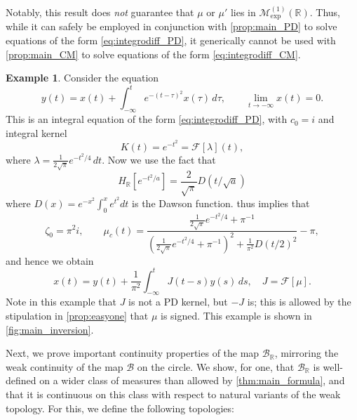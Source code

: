 \documentclass{cams-l} %
\newcommand{\dave}[1]{#1}\newcommand{\davebegin}{}\newcommand{\daveend}{}\newcommand{\george}[1]{#1}
\newcommand{\RR}{\mathbb R}
\newcommand{\cM}{\mathcal M}
\newcommand{\cB}{\mathcal B}
\newcommand{\cF}{\mathcal F}
\theoremstyle{definition}
\newtheorem{example}[theorem]{Example}
\theoremstyle{remark}
\numberwithin{equation}{section}
\begin{document}
Notably, this result does \emph{not} guarantee that $\mu$ or $\mu'$ lies in $\cM_\mathrm{exp}^{(1)}(\RR)$. Thus, while it can safely be employed in conjunction with \cref{prop:main_PD} to solve equations of the form \ref{eq:integrodiff_PD}, it generically cannot be used with \cref{prop:main_CM} to solve equations of the form \ref{eq:integrodiff_CM}.
\begin{example}\label{ex:gPD_complex}
    Consider the equation
    \[y(t) = x(t) + \int_{-\infty}^t e^{-(t-\tau)^2}x(\tau)\,d\tau,\qquad \lim_{t\to-\infty}x(t) = 0.\]
    This is an integral equation of the form \ref{eq:integrodiff_PD}, with $c_0 = i$ and integral kernel
    \[K(t) = e^{-t^2} = \cF[\lambda](t),\]
    where $\lambda = \tfrac{1}{2\sqrt{\pi}}e^{-t^2/4}\,dt$. Now we use the fact that
    \begin{equation}
        H_\RR[e^{-t^2/a}] = \frac{2}{\sqrt{\pi}}D(t/\sqrt{a})
    \end{equation}
    where $D(x) = e^{-x^2}\int_0^xe^{t^2}dt$ is the Dawson function.  thus implies that
    \[\zeta_0=\pi^2i,\qquad \mu_c(t) = \frac{\tfrac{1}{2\sqrt{\pi}}e^{-t^2/4} + \pi^{-1}}{(\tfrac{1}{2\sqrt{\pi}}e^{-t^2/4} + \pi^{-1})^2 + \frac{1}{\pi^2}D(t/2)^2}- \pi,\]
    and hence we obtain
    \[x(t) = y(t) + \frac{1}{\pi^2}\int_{-\infty}^tJ(t-s)y(s)\,ds, \quad J = \cF[\mu].\]
    Note in this example that $J$ is not a PD kernel, but $-J$ is; this is allowed by the stipulation in \cref{prop:easyone} that $\mu$ is signed. \dave{This example} is shown in \cref{fig:main_inversion}.
\end{example}


Next, we prove important continuity properties of the map $\cB_\RR$, \dave{mirroring the weak continuity of the map $\cB$ on the circle}. We show, for one, that $\cB_\RR$ is well-defined on a wider class of measures than allowed by \cref{thm:main_formula}, and that it is continuous \dave{on this class} with respect to natural variants of the weak topology. For this, we define the following topologies:
\end{document}

